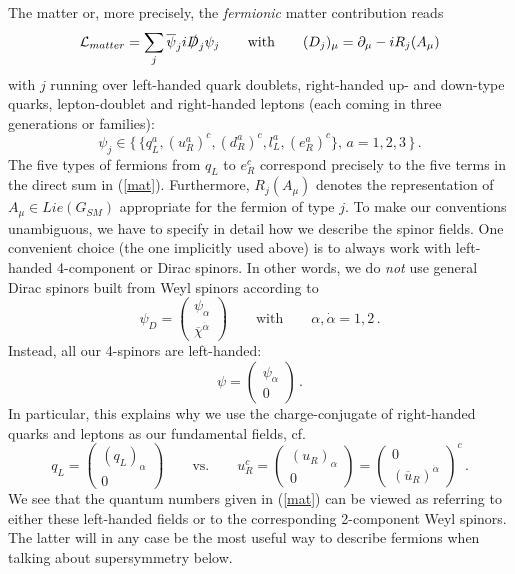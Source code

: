 \documentclass[12pt]{article}
\newcommand{\be}{\begin{equation}}
\newcommand{\ee}{\end{equation}}
\newcommand{\ol}{\overline}
\numberwithin{equation}{section}
\begin{document}
The matter  or, more precisely, the {\it fermionic} matter contribution reads
\be
{\cal L}_{matter}=\sum_j \ol{\psi}_j i\slashed{D}_j\psi_j\qquad\mbox{with}\qquad
(D_j)_\mu=\partial_\mu-iR_j(A_\mu)
\ee
with $j$ running over left-handed quark doublets, right-handed up- and 
down-type quarks, lepton-doublet and right-handed leptons (each coming in three generations or families):
\be
\psi_j\in\{\,\{q_L^a,(u_R^a)^c,(d_R^a)^c,l_L^a,(e_R^a)^c\},\,a=1,2,3\,\}\,.
\label{fie}
\ee
The five types of fermions from $q_L$ to $e_R^c$ correspond precisely to the five terms in the direct sum in (\ref{mat}). Furthermore, $R_j(A_\mu)$ denotes the representation of $A_\mu\in Lie(G_{SM})$ appropriate for the fermion of type $j$. To make our conventions unambiguous, we have to specify in detail how we describe the spinor fields. One convenient choice (the one implicitly used above) is to always work with left-handed 4-component or Dirac spinors.  In other words, we do {\it not} use general Dirac spinors built from Weyl spinors  according to 
\be
\psi_D=\left(\!\begin{array}{c}\psi_\alpha \\ \ol{\chi}^{\dot{\alpha}}\end{array}\!\right)\qquad\mbox{with}\qquad \alpha,\dot{\alpha}=1,2\,.
\ee
Instead, all our 4-spinors are left-handed:
\be
\psi=\left(\!\begin{array}{c}\psi_\alpha \\ 0\end{array}\!\right)\,.
\ee
In particular, this explains why we use the charge-conjugate of right-handed quarks and leptons as our fundamental fields, cf.
\be
q_L=\left(\!\begin{array}{c}(q_L)_\alpha \\ 0\end{array}\!\right) \qquad\mbox{vs.}\qquad
u_R^c=\left(\!\begin{array}{c}(u_R)_\alpha \\ 0\end{array}\!\right)=
\left(\!\begin{array}{c}0 \\ (\ol{u}_R)^{\dot{\alpha}}\end{array}\!\right)^c\,.
\ee
We see that the quantum numbers given in (\ref{mat}) can be viewed as referring to either these left-handed fields or to the corresponding 2-component Weyl spinors. The latter will in any case be the most useful way to describe fermions when talking about supersymmetry below.
\end{document}
